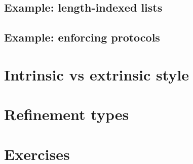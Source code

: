 \documentclass{beamer}
\begin{document}
\subsection{Example: length-indexed lists}

\subsection{Example: enforcing protocols}

\section{Intrinsic vs extrinsic style}

\section{Refinement types}

\section{Exercises}
\end{document}
